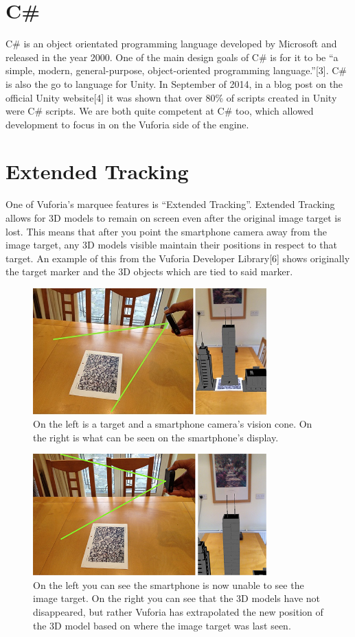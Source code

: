 \section{C\#}
C\# is an object orientated programming language developed by Microsoft and released in the year 2000. One of the main design goals of C\# is for it to be “a simple, modern, general-purpose, object-oriented programming language.”[3]. C\# is also the go to language for Unity. In September of 2014, in a blog post on the official Unity website[4] it was shown that over 80\% of scripts created in Unity were C\# scripts. We are both quite competent at C\# too, which allowed development to focus in on the Vuforia side of the engine.

\section{Extended Tracking}
One of Vuforia’s marquee features is “Extended Tracking”. Extended Tracking allows for 3D models to remain on screen even after the original image target is lost. This means that after you point the smartphone camera away from the image target, any 3D models visible maintain their positions in respect to that target. An example of this from the Vuforia Developer Library[6] shows originally the target marker and the 3D objects which are tied to said marker.

\begin{figure}[ht!]
	\centering
	\includegraphics[width=90mm]{extended1}
	\caption{On the left is a target and a smartphone camera’s vision cone. On the right is what can be seen on the smartphone’s display.
		 \label{overflow}}
\end{figure}

\clearpage

\begin{figure}[ht!]
	\centering
	\includegraphics[width=90mm]{extended2}
	\caption{On the left you can see the smartphone is now unable to see the image target.
		On the right you can see that the 3D models have not disappeared, but rather Vuforia has extrapolated the new position of the 3D model based on where the image target was last seen.
		 \label{overflow}}
\end{figure}


